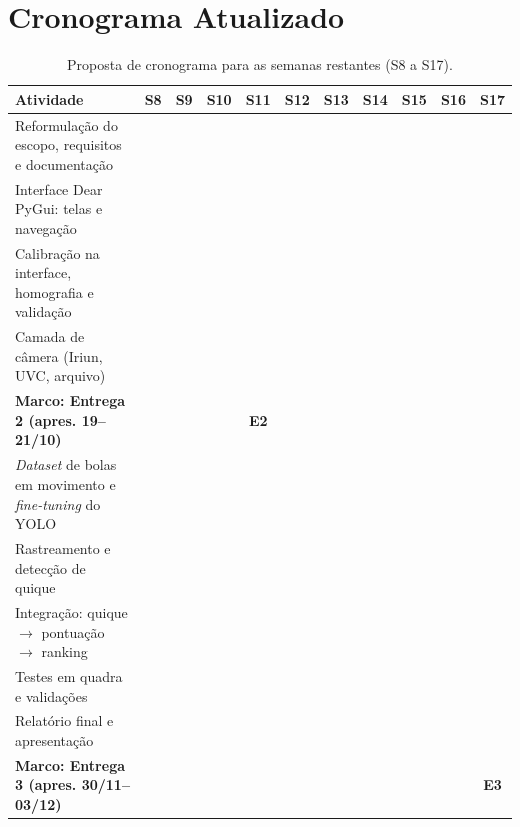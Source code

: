 \documentclass[a4paper,11pt]{article}
\begin{document}
\section{Cronograma Atualizado}
\begin{table}[H]
\centering
\scriptsize
\renewcommand{\arraystretch}{1.2}
\setlength{\tabcolsep}{3pt}
\caption{Proposta de cronograma para as semanas restantes (S8 a S17).}
\label{tab:gantt}
\begin{tabularx}{\textwidth}{X *{10}{c}}
\toprule
\textbf{Atividade} & \textbf{S8} & \textbf{S9} & \textbf{S10} & \textbf{S11} & \textbf{S12} & \textbf{S13} & \textbf{S14} & \textbf{S15} & \textbf{S16} & \textbf{S17} \\
\midrule
Reformulação do escopo, requisitos e documentação & \cellcolor{ganttblue} & \cellcolor{ganttblue} & & & & & & & & \\
\rowcolor{rowgray}
Interface Dear PyGui: telas e navegação & & \cellcolor{ganttblue} & \cellcolor{ganttblue} & \cellcolor{ganttblue} & & & & & & \\
Calibração na interface, homografia e validação & & & \cellcolor{ganttblue} & \cellcolor{ganttblue} & \cellcolor{ganttblue} & & & & & \\
\rowcolor{rowgray}
Camada de câmera (Iriun, UVC, arquivo) & & & \cellcolor{ganttblue} & \cellcolor{ganttblue} & & & & & & \\
\textbf{Marco: Entrega 2 (apres. 19--21/10)} & & & & \cellcolor{ganttorange}\textbf{E2} & & & & & & \\
\rowcolor{rowgray}
\textit{Dataset} de bolas em movimento e \textit{fine-tuning} do YOLO & & & \cellcolor{ganttblue} & \cellcolor{ganttblue} & \cellcolor{ganttblue} & \cellcolor{ganttblue} & & & & \\
Rastreamento e detecção de quique & & & & & \cellcolor{ganttblue} & \cellcolor{ganttblue} & \cellcolor{ganttblue} & & & \\
\rowcolor{rowgray}
Integração: quique $\rightarrow$ pontuação $\rightarrow$ ranking & & & & & & & \cellcolor{ganttblue} & \cellcolor{ganttblue} & & \\
Testes em quadra e validações & & & & & & & & \cellcolor{ganttblue} & \cellcolor{ganttblue} & \\
\rowcolor{rowgray}
Relatório final e apresentação & & & & & & & & & \cellcolor{ganttblue} & \cellcolor{ganttblue} \\
\textbf{Marco: Entrega 3 (apres. 30/11--03/12)} & & & & & & & & & & \cellcolor{ganttgreen}\textbf{E3} \\
\bottomrule
\end{tabularx}
\end{table}
\end{document}
